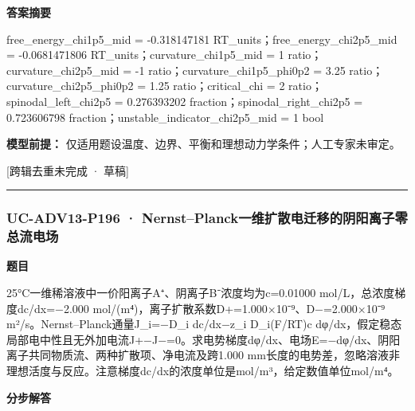 \documentclass[UTF8,11pt,a4paper]{ctexart}
\begin{document}
\noindent\textbf{答案摘要}\par
free\_energy\_chi1p5\_mid = -0.318147181 RT\_units；free\_energy\_chi2p5\_mid = -0.0681471806 RT\_units；curvature\_chi1p5\_mid = 1 ratio；curvature\_chi2p5\_mid = -1 ratio；curvature\_chi1p5\_phi0p2 = 3.25 ratio；curvature\_chi2p5\_phi0p2 = 1.25 ratio；critical\_chi = 2 ratio；spinodal\_left\_chi2p5 = 0.276393202 fraction；spinodal\_right\_chi2p5 = 0.723606798 fraction；unstable\_indicator\_chi2p5\_mid = 1 bool\par
\noindent\textbf{模型前提：}
仅适用题设温度、边界、平衡和理想动力学条件；人工专家未审定。\par
\noindent\textcolor{red!65!black}{[跨辑去重未完成 · 草稿]} \par
\medskip\hrule\medskip
{}
\subsubsection*{UC-ADV13-P196 · Nernst–Planck一维扩散电迁移的阴阳离子零总流电场}
\noindent\textbf{题目}\par
25°C一维稀溶液中一价阳离子A⁺、阴离子B⁻浓度均为c=0.01000 mol/L，总浓度梯度dc/dx=−2.000 mol/(m⁴)，离子扩散系数D+=1.000×10⁻⁹、D−=2.000×10⁻⁹ m²/s。Nernst–Planck通量J\_i=−D\_i dc/dx−z\_i D\_i(F/RT)c dφ/dx，假定稳态局部电中性且无外加电流J+−J−=0。求电势梯度dφ/dx、电场E=−dφ/dx、阴阳离子共同物质流、两种扩散项、净电流及跨1.000 mm长度的电势差，忽略溶液非理想活度与反应。注意梯度dc/dx的浓度单位是mol/m³，给定数值单位mol/m⁴。\par
\medskip\noindent\textbf{分步解答}
\end{document}
